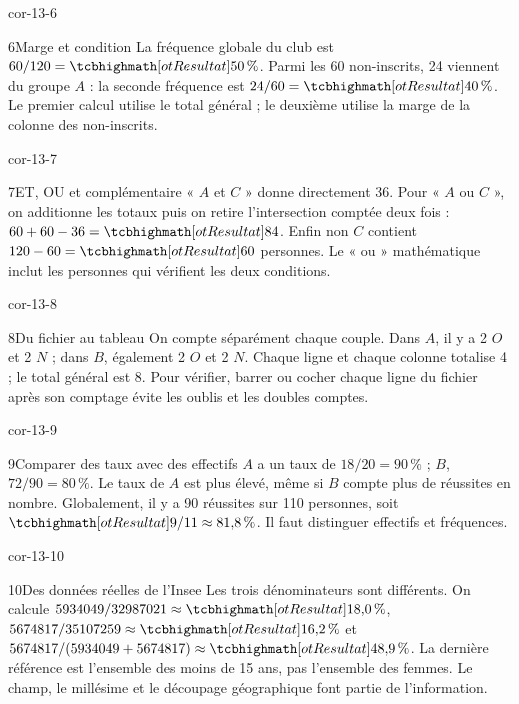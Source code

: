 \begin{blocLivre}{cor-13-6}
\begin{corrige}{6}{Marge et condition}
La fréquence globale du club est $60/120=\res{50\,\%}$. Parmi les 60 non-inscrits, 24 viennent du groupe $A$ : la seconde fréquence est $24/60=\res{40\,\%}$. Le premier calcul utilise le total général ; le deuxième utilise la marge de la colonne des non-inscrits.
\end{corrige}
\end{blocLivre}
\begin{blocLivre}{cor-13-7}
\begin{corrige}{7}{ET, OU et complémentaire}
« $A$ et $C$ » donne directement 36. Pour « $A$ ou $C$ », on additionne les totaux puis on retire l’intersection comptée deux fois : $60+60-36=\res{84}$. Enfin non $C$ contient $120-60=\res{60}$ personnes. Le « ou » mathématique inclut les personnes qui vérifient les deux conditions.
\label{fig-cor-13-7}
\end{corrige}
\end{blocLivre}
\begin{blocLivre}{cor-13-8}
\begin{corrige}{8}{Du fichier au tableau}
On compte séparément chaque couple. Dans $A$, il y a 2 $O$ et 2 $N$ ; dans $B$, également 2 $O$ et 2 $N$. Chaque ligne et chaque colonne totalise 4 ; le total général est 8. Pour vérifier, barrer ou cocher chaque ligne du fichier après son comptage évite les oublis et les doubles comptes.
\end{corrige}
\end{blocLivre}
\begin{blocLivre}{cor-13-9}
\begin{corrige}{9}{Comparer des taux avec des effectifs}
$A$ a un taux de $18/20=90\,\%$ ; $B$, $72/90=80\,\%$. Le taux de $A$ est plus élevé, même si $B$ compte plus de réussites en nombre. Globalement, il y a 90 réussites sur 110 personnes, soit $\res{9/11\approx81{,}8\,\%}$. Il faut distinguer effectifs et fréquences.
\end{corrige}
\end{blocLivre}
\begin{blocLivre}{cor-13-10}
\begin{corrige}{10}{Des données réelles de l’Insee}
Les trois dénominateurs sont différents. On calcule $5934049/32987021\approx\res{18{,}0\,\%}$, $5674817/35107259\approx\res{16{,}2\,\%}$ et $5674817/(5934049+5674817)\approx\res{48{,}9\,\%}$. La dernière référence est l’ensemble des moins de 15 ans, pas l’ensemble des femmes. Le champ, le millésime et le découpage géographique font partie de l’information.
\end{corrige}
\end{blocLivre}
